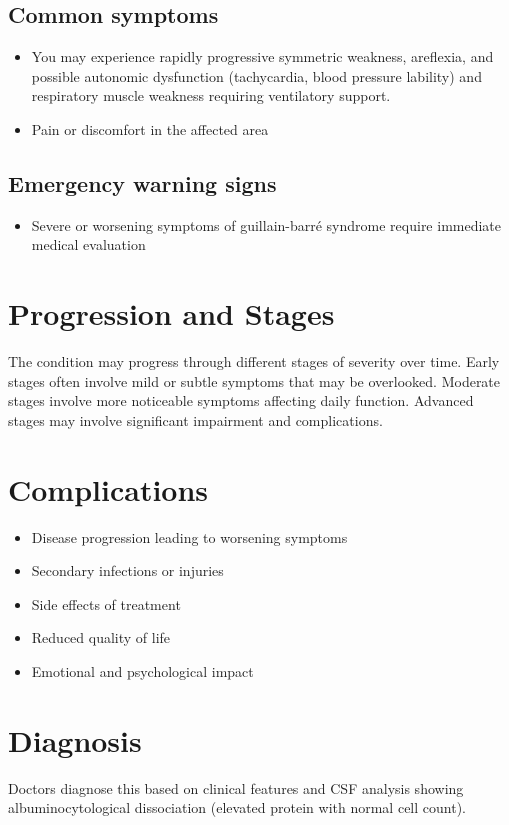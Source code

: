 \subsection{Common symptoms}
\begin{itemize}[noitemsep]
  \item You may experience rapidly progressive symmetric weakness, areflexia, and possible autonomic dysfunction (tachycardia, blood pressure lability) and respiratory muscle weakness requiring ventilatory support.

  \item Pain or discomfort in the affected area
  \end{itemize}

\subsection{Emergency warning signs}
\begin{itemize}[noitemsep]
  \item Severe or worsening symptoms of guillain-barr\'{e} syndrome require immediate medical evaluation
\end{itemize}
\section{Progression and Stages}
The condition may progress through different stages of severity over time. Early stages often involve mild or subtle symptoms that may be overlooked. Moderate stages involve more noticeable symptoms affecting daily function. Advanced stages may involve significant impairment and complications.
\section{Complications}
\begin{itemize}[noitemsep]
  \item Disease progression leading to worsening symptoms
  \item Secondary infections or injuries
  \item Side effects of treatment
  \item Reduced quality of life
  \item Emotional and psychological impact
\end{itemize}
\section{Diagnosis}
Doctors diagnose this based on clinical features and CSF analysis showing albuminocytological dissociation (elevated protein with normal cell count).

